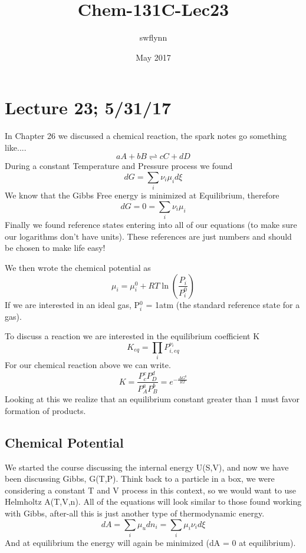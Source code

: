 \documentclass{article}
\title{Chem-131C-Lec23}
\author{swflynn}
\date{May 2017}
\begin{document}
\maketitle

\section*{Lecture 23; 5/31/17}
In Chapter 26 we discussed a chemical reaction, the spark notes go something like....
\begin{equation}
aA + bB  \rightleftharpoons cC + dD 
\end{equation}
During a constant Temperature and Pressure process we found
\begin{equation}
    dG = \sum_i \nu_i\mu_id\xi
\end{equation}
We know that the Gibbs Free energy is minimized at Equilibrium, therefore
\begin{equation}
    dG = 0 = \sum_i\nu_i\mu_i
\end{equation}
Finally we found reference states entering into all of our equations (to make sure our logarithms don't have units).
These references are just numbers and should be chosen to make life easy!

We then wrote the chemical potential as
\begin{equation}
    \mu_i = \mu_i^0 + RT \ln\left(\frac{P_i}{P_i^0}\right)
\end{equation}
If we are interested in an ideal gas, P$_i^0$ = 1atm (the standard reference state for a gas). 

To discuss a reaction we are interested in the equilibrium coefficient K 
\begin{equation}
    K_{eq} =\prod_i P_{i,eq}^{\nu_i}
\end{equation}
For our chemical reaction above we can write. 
\begin{equation}
    K = \frac{P_c^cP_D^d}{P_A^aP_B^b} = e^{-\frac{\Delta G^0}{RT}}
\end{equation}
Looking at this we realize that an equilibrium constant greater than 1 must favor formation of products. 

\subsection*{Chemical Potential}
We started the course discussing the internal energy U(S,V), and now we have been discussing Gibbs, G(T,P). 
Think back to a particle in a box, we were considering a constant T and V process in this context, so we would want to use Helmholtz A(T,V,n). 
All of the equations will look similar to those found working with Gibbs, after-all this is just another type of thermodynamic energy. 
\begin{equation}
    dA = \sum_i\mu_udn_i = \sum_i \mu_i\nu_id\xi
\end{equation}
And at equilibrium the energy will again be minimized (dA = 0 at equilibrium). 
\end{document}
